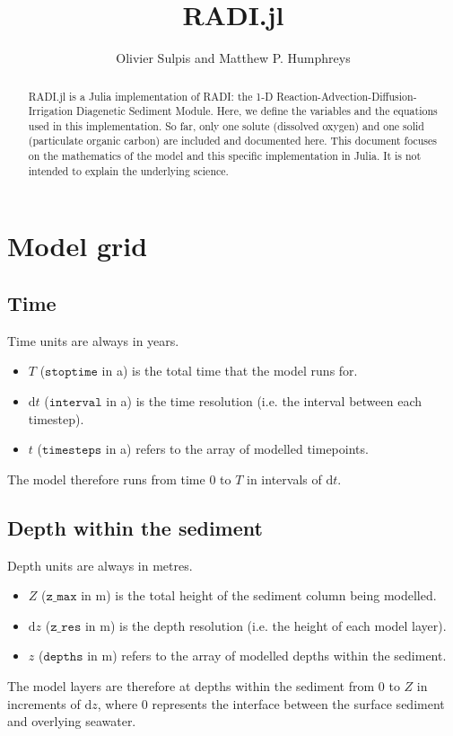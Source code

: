 \documentclass[a4paper]{article}
\newcommand{\D}[1]{\mathrm{d}#1}
\newcommand{\code}[1]{\texttt{#1}}
\begin{document}
\title{RADI.jl}
\author{Olivier Sulpis and Matthew P. Humphreys}

\maketitle

\begin{abstract}
RADI.jl is a Julia implementation of RADI: the 1-D Reaction-Advection-Diffusion-Irrigation Diagenetic Sediment Module.  Here, we define the variables and the equations used in this implementation. So far, only one solute (dissolved oxygen) and one solid (particulate organic carbon) are included and documented here.  This document focuses on the mathematics of the model and this specific implementation in Julia.  It is not intended to explain the underlying science.
\end{abstract}



\section{Model grid}

\subsection{Time}

Time units are always in years.
\begin{itemize}
  \item $T$ ($\code{stoptime}$ in a) is the total time that the model runs for.
  \item $\D{t}$ ($\code{interval}$ in a) is the time resolution (i.e. the interval between each timestep).
  \item $t$ ($\code{timesteps}$ in a) refers to the array of modelled timepoints.
\end{itemize}
The model therefore runs from time $0$ to $T$ in intervals of $\D{t}$.


\subsection{Depth within the sediment}

Depth units are always in metres.
\begin{itemize}
  \item $Z$ ($\code{z\_max}$ in m) is the total height of the sediment column being modelled.
  \item $\D{z}$ ($\code{z\_res}$ in m) is the depth resolution (i.e. the height of each model layer).
  \item $z$ ($\code{depths}$ in m) refers to the array of modelled depths within the sediment.
\end{itemize}
The model layers are therefore at depths within the sediment from $0$ to $Z$ in increments of $\D{z}$, where $0$ represents the interface between the surface sediment and overlying seawater.
\end{document}

